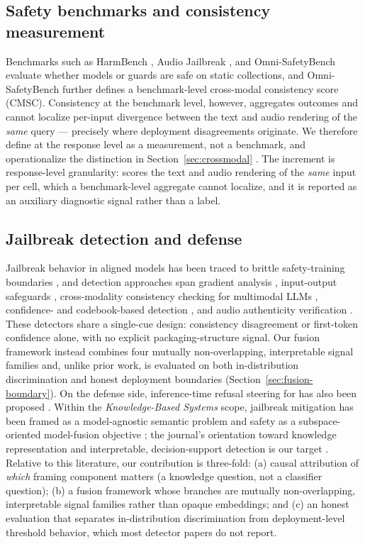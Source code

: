 \subsection{Safety benchmarks and consistency measurement}
Benchmarks such as HarmBench \citep{harmbench}, Audio Jailbreak
\citep{audio-jailbreak}, and Omni-SafetyBench \citep{omnisafetybench} evaluate
whether models or guards are safe on static collections, and Omni-SafetyBench
further defines a benchmark-level cross-modal consistency score (CMSC).
Consistency at the benchmark level, however, aggregates outcomes and cannot
localize per-input divergence between the text and audio rendering of the
\emph{same} query --- precisely where deployment disagreements originate. We
therefore define \PCSD{} at the response level as a measurement, not a
benchmark, and operationalize the distinction in
Section~\ref{sec:crossmodal} \citep{omnisafetybench}. The increment is
response-level granularity: \PCSD{} scores the text and audio rendering of
the \emph{same} input per cell, which a benchmark-level aggregate cannot
localize, and it is reported as an auxiliary diagnostic signal rather than a
label.

\subsection{Jailbreak detection and defense}
Jailbreak behavior in aligned models has been traced to brittle safety-training
boundaries \citep{jailbroken}, and detection approaches span gradient analysis
\citep{gradsafe}, input-output safeguards
\citep{llamaguard,shieldgemma,wildguard}, cross-modality consistency checking
for multimodal LLMs \citep{crossmodal-info}, confidence- and codebook-based
detection \citep{chen2025,codebooks}, and audio authenticity verification
\citep{xie2024fakesound}. These detectors share a single-cue
design: consistency disagreement \citep{crossmodal-info} or first-token
confidence \citep{chen2025,codebooks} alone, with no explicit
packaging-structure signal. Our fusion framework instead combines four mutually
non-overlapping, interpretable signal families and, unlike prior work, is
evaluated on both in-distribution discrimination and honest deployment
boundaries (Section~\ref{sec:fusion-boundary}). On the defense side,
inference-time refusal steering for \LALMs{} has also been proposed
\citep{lin2026sarsteer}. Within the
\emph{Knowledge-Based Systems} scope,
jailbreak mitigation has been framed as a model-agnostic semantic problem
\citep{srd} and safety as a subspace-oriented model-fusion objective
\citep{realignment}; the journal's orientation toward knowledge representation
and interpretable, decision-support detection is our target
\citep{srd,realignment}. Relative to this literature, our contribution is
three-fold: (a) causal attribution of \emph{which} framing component matters (a
knowledge question, not a classifier question); (b) a fusion framework whose
branches are mutually non-overlapping, interpretable signal families rather than
opaque embeddings; and (c) an honest evaluation that separates in-distribution
discrimination from deployment-level threshold behavior, which most detector
papers do not report.

